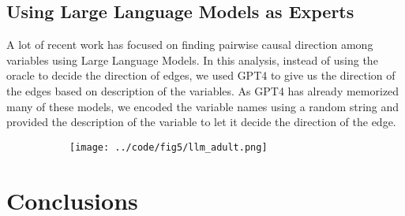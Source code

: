 \documentclass{uai2025} %
\begin{document}
\subsection{Using Large Language Models as Experts}
A lot of recent work has focused on finding pairwise causal direction among
variables using Large Language Models. In this analysis, instead of using the
oracle to decide the direction of edges, we used GPT4 to give us the direction
of the edges based on description of the variables. As GPT4 has already
memorized many of these models, we encoded the variable names using a random
string and provided the description of the variable to let it decide the
direction of the edge.

\begin{figure}
	\centering
	\begin{subfigure}{0.5\textwidth}
		\caption{}
	\end{subfigure}
	\begin{subfigure}{0.5\textwidth}
		\centering
		\texttt{[image: ../code/fig5/llm\_adult.png]}
		\caption{}
	\end{subfigure}
\end{figure}

\section{Conclusions}

\newpage

\end{document}
